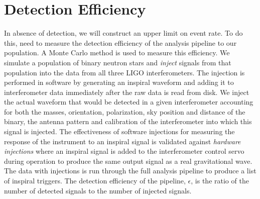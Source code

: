 \section{Detection Efficiency}
\label{s:eff}

In absence of detection, we will construct an upper limit on event rate.  To
do this, need to measure the detection efficiency of the analysis pipeline to
our population. A Monte Carlo method is used to measure this efficiency. We
simulate a population of binary neutron stars and \emph{inject} signals from
that population into the data from all three LIGO interferometers. The
injection is performed in software by generating an inspiral waveform and
adding it to interferometer data immediately after the raw data is read from
disk. We inject the actual waveform that would be detected in a given
interferometer accounting for both the masses, orientation, polarization, sky
position and distance of the binary, the antenna pattern and calibration of
the interferometer into which this signal is injected.  The effectiveness of
software injections for measuring the response of the instrument to an
inspiral signal is validated against \emph{hardware injections}\cite{hw} where
an inspiral signal is added to the interferometer control servo during
operation to produce the same output signal as a real gravitational wave.  The
data with injections is run through the full analysis pipeline to produce a
list of inspiral triggers. The detection efficiency of the pipeline,
$\epsilon$, is the ratio of the number of detected signals to the number of
injected signals.
